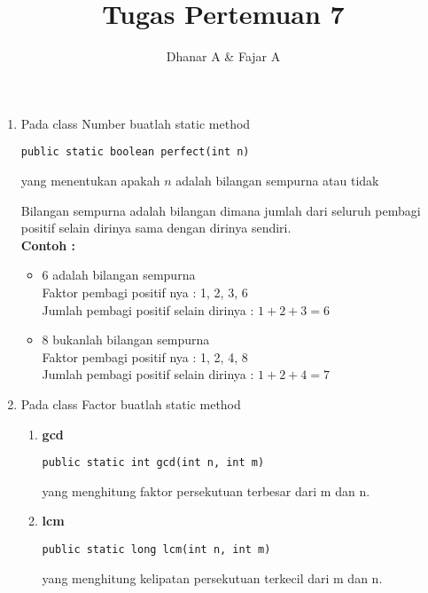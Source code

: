 \documentclass{article}
\title{\textbf{Tugas Pertemuan 7}}
\date{
}
\author{Dhanar A \& Fajar A}
\begin{document}
\maketitle

\begin{enumerate}
    \item Pada class Number buatlah static method

    \begin{lstlisting}[style=standard]
    public static boolean perfect(int n)
    \end{lstlisting}
    
    yang menentukan apakah $n$ adalah bilangan sempurna atau tidak

    \begin{hint}
        Bilangan sempurna adalah bilangan dimana jumlah dari seluruh pembagi positif selain dirinya sama dengan dirinya sendiri. \\
        \textbf{Contoh :}
       
        \begin{itemize}
            \item  6 adalah bilangan sempurna\\
            Faktor pembagi positif nya : 1, 2, 3, 6 \\
            Jumlah pembagi positif selain dirinya : $1+2+3=6$

            \item 8 bukanlah bilangan sempurna\\
            Faktor pembagi positif nya : 1, 2, 4, 8 \\
            Jumlah pembagi positif selain dirinya : $1+2+4=7$
        \end{itemize}
    \end{hint}

    \newpage
    \item Pada class Factor buatlah static method 
    \begin{enumerate}
        \item \textbf{gcd}\\
            \begin{lstlisting}[style=standard]
    public static int gcd(int n, int m)
            \end{lstlisting}
            yang menghitung faktor persekutuan terbesar dari m dan n.

        \item \textbf{lcm}\\
            \begin{lstlisting}[style=standard]
    public static long lcm(int n, int m)
            \end{lstlisting}
            yang menghitung kelipatan persekutuan terkecil dari m dan n.
    \end{enumerate}


\end{enumerate}
\end{document}

